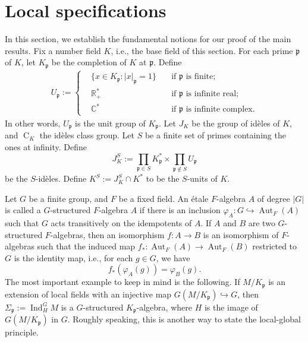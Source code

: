 \documentclass{amsart}
\numberwithin{equation}{section}
\theoremstyle{plain}
\theoremstyle{definition}
\theoremstyle{remark}
\begin{document}
\section{Local specifications}\label{sec: specifications}
In this section, we establish the fundamental notions for our proof of the main results.
Fix a number field $K$, i.e., the base field of this section.
For each prime $\mathfrak{p}$ of $K$, let $K_{\mathfrak{p}}$ be the completion of $K$ at $\mathfrak{p}$.
Define
\begin{equation*}
	\begin{aligned}
		U_{\mathfrak{p}}:=\left\{
		\begin{aligned}
			&\{x\in K_{\mathfrak{p}}:\lvert x\rvert_{\mathfrak{p}}=1\}\quad&\text{if }\mathfrak{p}\text{ is finite};
			\\
			&\mathbb{R}_+^*\quad&\text{if }\mathfrak{p}\text{ is infinite real};
			\\
			&\mathbb{C}^*\quad&\text{if }\mathfrak{p}\text{ is infinite complex}.
		\end{aligned}\right.
	\end{aligned}
\end{equation*}
In other words, $U_{\mathfrak{p}}$ is the unit group of $K_{\mathfrak{p}}$.
Let $J_K$ be the group of id{\`e}les of $K$, and $\operatorname{C}_K$ the id{\`e}les class group.
Let $S$ be a finite set of primes containing the ones at infinity.
Define
\begin{equation*}
	J_K^{S}:=\prod_{\mathfrak{p}\in S}K_{\mathfrak{p}}^*\times\prod_{\mathfrak{p}\notin S}U_{\mathfrak{p}}
\end{equation*} 
be the $S$-id{\`e}les.
Define $K^S:=J_K^S\cap K^*$ to be the $S$-units of $K$.

Let $G$ be a finite group, and $F$ be a fixed field.
An {\'e}tale $F$-algebra $A$ of degree $\lvert G\rvert$ is called a $G$-structured $F$-algebra $A$ if there is an inclusion $\varphi_A:G\hookrightarrow\operatorname{Aut}_F(A)$ such that $G$ acts transitively on the idempotents of $A$.
If $A$ and $B$ are two $G$-structured $F$-algebras, then an isomorphism $f:A\to B$ is an isomorphism of $F$-algebras such that the induced map $f_*:\operatorname{Aut}_F(A)\to\operatorname{Aut}_F(B)$ restricted to $G$ is the identity map, i.e.,
for each $g\in G$, we have 
\begin{equation*}
	f_*(\varphi_A(g))=\varphi_B(g).
\end{equation*}
The most important example to keep in mind is the following.
If $M/K_{\mathfrak{p}}$ is an extension of local fields with an injective map $G(M/K_{\mathfrak{p}})\hookrightarrow G$, then $\Sigma_{\mathfrak{p}}:=\operatorname{Ind}^G_H M$ is a $G$-structured $K_{\mathfrak{p}}$-algebra, where $H$ is the image of $G(M/K_{\mathfrak{p}})$ in $G$.
Roughly speaking, this is another way to state the local-global principle.
\end{document}
